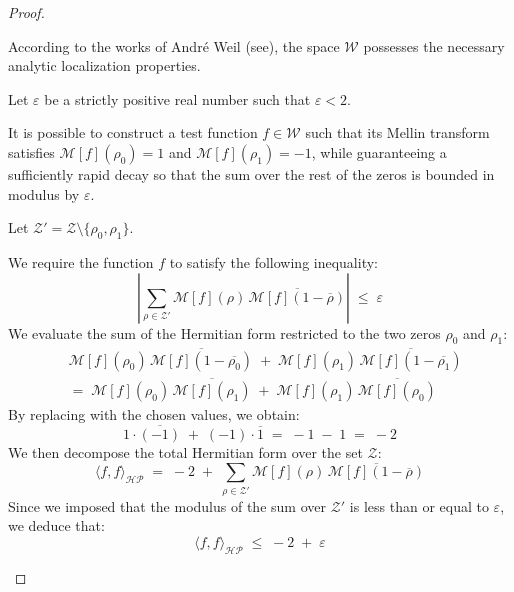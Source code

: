 \documentclass[Riemann_Hypothesis.tex]{subfiles}
\begin{document}
\begin{proof}
\begin{part_proof}
        According to the works of André Weil (see\cite{weil1952_formules_en}), the space $\mathcal{W}$ possesses the necessary analytic localization properties. \par
        Let $\varepsilon$ be a strictly positive real number such that $\varepsilon < 2$. \par
        It is possible to construct a test function $f \in \mathcal{W}$ such that its Mellin transform satisfies $\mathcal{M}[f](\rho_0) = 1$ and $\mathcal{M}[f](\rho_1) = -1$, while guaranteeing a sufficiently rapid decay so that the sum over the rest of the zeros is bounded in modulus by $\varepsilon$. \par
        Let $\mathcal{Z}' = \mathcal{Z} \setminus \{\rho_0, \rho_1\}$. \par
        We require the function $f$ to satisfy the following inequality:
        \begin{equation*}
            \left| \sum_{\rho \in \mathcal{Z}'} \mathcal{M}[f](\rho) \, \overline{\mathcal{M}[f](1 - \overline{\rho})} \right| \;\leq\; \varepsilon
        \end{equation*}
        We evaluate the sum of the Hermitian form restricted to the two zeros $\rho_0$ and $\rho_1$:
        \begin{align*}
            &\mathcal{M}[f](\rho_0) \, \overline{\mathcal{M}[f](1 - \overline{\rho_0})} \;+\; \mathcal{M}[f](\rho_1) \, \overline{\mathcal{M}[f](1 - \overline{\rho_1})}\\
            &=\; \mathcal{M}[f](\rho_0) \, \overline{\mathcal{M}[f](\rho_1)} \;+\; \mathcal{M}[f](\rho_1) \, \overline{\mathcal{M}[f](\rho_0)}
        \end{align*}
        By replacing with the chosen values, we obtain:
        \begin{equation*}
            1 \cdot \overline{(-1)} \;+\; (-1) \cdot \overline{1} \;=\; -1 \;-\; 1 \;=\; -2
        \end{equation*}
        We then decompose the total Hermitian form over the set $\mathcal{Z}$:
        \begin{equation*}
            \langle f, f \rangle_{\mathcal{HP}} \;=\; -2 \;+\; \sum_{\rho \in \mathcal{Z}'} \mathcal{M}[f](\rho) \, \overline{\mathcal{M}[f](1 - \overline{\rho})}
        \end{equation*}
        Since we imposed that the modulus of the sum over $\mathcal{Z}'$ is less than or equal to $\varepsilon$, we deduce that:
        \begin{equation*}
            \langle f, f \rangle_{\mathcal{HP}} \;\leq\; -2 \;+\; \varepsilon

\end{equation*}
\end{part_proof}
\end{proof}
\end{document}
